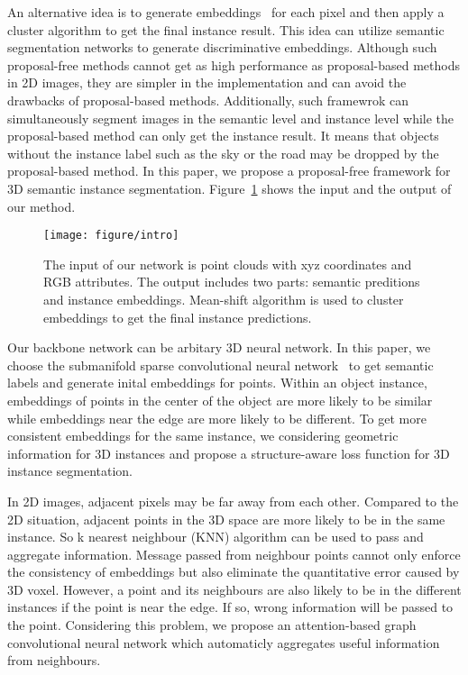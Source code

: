 \documentclass{article}
\begin{document}
An alternative idea is to generate embeddings~\cite{fathi2017semantic,kong2018recurrent,de2017semantic} for each pixel and then apply a cluster algorithm to get the final instance result. This idea can utilize semantic segmentation networks to generate discriminative embeddings. Although such proposal-free methods cannot get as high performance as proposal-based methods in 2D images, they are simpler in the implementation and can avoid the drawbacks of proposal-based methods. Additionally, such framewrok can simultaneously segment images in the semantic level and instance level while the proposal-based method can only get the instance result. It means that objects without the instance label such as the sky or the road may be dropped by the proposal-based method. In this paper, we propose a proposal-free framework for 3D semantic instance segmentation. Figure~\ref{intro} shows the input and the output of our method.


\begin{figure}[t]
	\centering
	\texttt{[image: figure/intro]}
	\caption{The input of our network is point clouds with xyz coordinates and RGB attributes. The output includes two parts: semantic preditions and instance embeddings. Mean-shift algorithm is used to cluster embeddings to get the final instance predictions.}
	\label{intro}
\end{figure}

Our backbone network can be arbitary 3D neural network. In this paper, we choose the submanifold sparse convolutional neural network~\cite{graham20183d} to get semantic labels and generate inital embeddings for points. Within an object instance, embeddings of points in the center of the object are more likely to be similar while embeddings near the edge are more likely to be different. To get more consistent embeddings for the same instance, we considering geometric information for 3D instances and propose a structure-aware loss function for 3D instance segmentation. 

In 2D images, adjacent pixels may be far away from each other. Compared to the 2D situation, adjacent points in the 3D space are more likely to be in the same instance. So k nearest neighbour (KNN) algorithm can be used to pass and aggregate information. Message passed from neighbour points cannot only enforce the consistency of embeddings but also eliminate the quantitative error caused by 3D voxel. However, a point and its neighbours are also likely to be in the different instances if the point is near the edge. If so, wrong information will be passed to the point. Considering this problem, we propose an attention-based graph convolutional neural network which automaticly aggregates useful information from neighbours.
\end{document}
